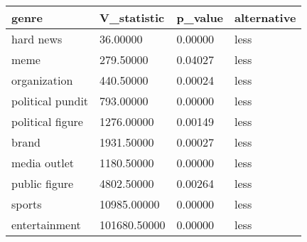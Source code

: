\begin{table}
\centering
\begin{tabular}[t]{llll}
\toprule
genre & V\_statistic & p\_value & alternative\\
\midrule
hard news & 36.00000 & 0.00000 & less\\
meme & 279.50000 & 0.04027 & less\\
organization & 440.50000 & 0.00024 & less\\
political pundit & 793.00000 & 0.00000 & less\\
political figure & 1276.00000 & 0.00149 & less\\
brand & 1931.50000 & 0.00027 & less\\
media outlet & 1180.50000 & 0.00000 & less\\
public figure & 4802.50000 & 0.00264 & less\\
sports & 10985.00000 & 0.00000 & less\\
entertainment & 101680.50000 & 0.00000 & less\\
\bottomrule
\end{tabular}
\end{table}
